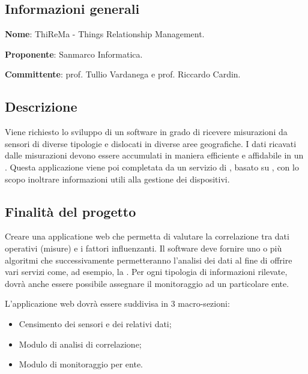 \documentclass[../studio-di-fattibilita.tex]{subfiles}
\begin{document}
\subsection{Informazioni generali}%
\label{sub:informazioni_generale}
\begin{description}
  \item \textbf{Nome}: ThiReMa - Things Relationship Management.
  \item \textbf{Proponente}: Sanmarco Informatica.
  \item \textbf{Committente}: prof. Tullio Vardanega e prof. Riccardo Cardin.
\end{description}

\subsection{Descrizione}%
\label{sub:descrizione}
Viene richiesto lo sviluppo di un software in grado di ricevere misurazioni da sensori di diverse tipologie e dislocati in diverse aree geografiche. I dati ricavati dalle misurazioni devono essere accumulati in maniera efficiente e affidabile in un . Questa applicazione viene poi completata da un servizio di , basato su , con lo scopo inoltrare informazioni utili alla gestione dei dispositivi.

\subsection{Finalità del progetto}%
\label{sub:finalita_del_progetto}
Creare una applicatione web che permetta di  valutare la correlazione tra dati operativi (misure) e i fattori influenzanti. Il software deve fornire uno o più algoritmi che successivamente permetteranno l'analisi dei dati al fine di offrire vari servizi come, ad esempio, la .
Per ogni tipologia di informazioni rilevate, dovrà anche essere possibile assegnare il monitoraggio ad un particolare ente.

L'applicazione web dovrà essere suddivisa in 3 macro-sezioni:
\begin{itemize}
    \item Censimento dei sensori e dei relativi dati;
    \item Modulo di analisi di correlazione;
    \item Modulo di monitoraggio per ente.
\end{itemize}
\end{document}
